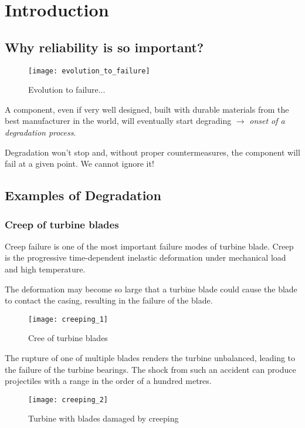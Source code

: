 
\chapter{Introduction}
\section{Why reliability is so important?}

\begin{figure}[!htp]
    \centering
    \texttt{[image: evolution\_to\_failure]}
    \caption{Evolution to failure...}
\end{figure}

A component, even if very well designed, built with durable materials from the
best manufacturer in the world, will eventually start degrading $\to$
\emph{onset of a degradation process}.

Degradation won't stop and, without proper countermeasures, the component will
fail at a given point. We cannot ignore it!

\section{Examples of Degradation}
\subsection{Creep of turbine blades}

Creep failure is one of the most important failure modes of turbine blade. Creep
is the progressive time-dependent inelastic deformation under mechanical load
and high temperature.

The deformation may become so large that a turbine blade could cause the blade
to contact the casing, resulting in the failure of the blade.

\begin{figure}[!htp]
    \centering
    \texttt{[image: creeping\_1]}
    \caption{Cree of turbine blades}
\end{figure}

The rupture of one of multiple blades renders the turbine unbalanced, leading to
the failure of the turbine bearings. The shock from such an accident can produce
projectiles with a range in the order of a hundred metres.

\begin{figure}[!htp]
    \centering
    \texttt{[image: creeping\_2]}
    \caption{Turbine with blades damaged by creeping}
\end{figure}

